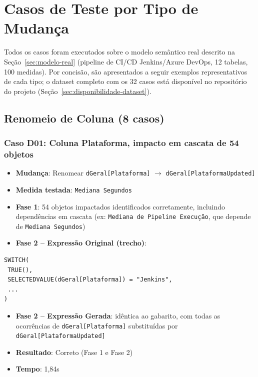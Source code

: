 \section{Casos de Teste por Tipo de Mudança}

Todos os casos foram executados sobre o modelo semântico real descrito na Seção~\ref{sec:modelo-real} (pipeline de CI/CD Jenkins/Azure DevOps, 12 tabelas, 100 medidas). Por concisão, são apresentados a seguir exemplos representativos de cada tipo; o dataset completo com os 32 casos está disponível no repositório do projeto (Seção~\ref{sec:disponibilidade-dataset}).

\subsection{Renomeio de Coluna (8 casos)}

\subsubsection{Caso D01: Coluna Plataforma, impacto em cascata de 54 objetos}

\begin{itemize}
    \item \textbf{Mudança}: Renomear \texttt{dGeral[Plataforma]} $\rightarrow$ \texttt{dGeral[PlataformaUpdated]}
    \item \textbf{Medida testada}: \texttt{Mediana Segundos}
    \item \textbf{Fase 1}: 54 objetos impactados identificados corretamente, incluindo dependências em cascata (ex: \texttt{Mediana de Pipeline Execução}, que depende de \texttt{Mediana Segundos})
    \item \textbf{Fase 2 -- Expressão Original (trecho)}:
\end{itemize}

\begin{verbatim}
SWITCH(
 TRUE(),
 SELECTEDVALUE(dGeral[Plataforma]) = "Jenkins",
 ...
)
\end{verbatim}

\begin{itemize}
    \item \textbf{Fase 2 -- Expressão Gerada}: idêntica ao gabarito, com todas as ocorrências de \texttt{dGeral[Plataforma]} substituídas por \texttt{dGeral[PlataformaUpdated]}
    \item \textbf{Resultado}: Correto (Fase 1 e Fase 2)
    \item \textbf{Tempo}: 1,84s
\end{itemize}

